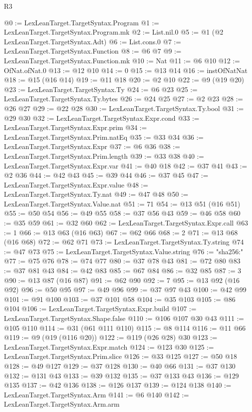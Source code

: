 \begin{lexlean}{R3}
\begin{coremodule}
@0 := LexLeanTarget.TargetSyntax.Program
@1 := LexLeanTarget.TargetSyntax.Program.mk
@2 := List.nil.{0}
@5 := @1 (@2 LexLeanTarget.TargetSyntax.Adt)
@6 := List.cons.{0}
@7 := LexLeanTarget.TargetSyntax.Function
@8 := @6 @7
@9 := LexLeanTarget.TargetSyntax.Function.mk
@10 := Nat
@11 := @6 @10
@12 := OfNat.ofNat.{0}
@13 := @12 @10
@14 := 0
@15 := @13 @14
@16 := instOfNatNat
@18 := @15 (@16 @14)
@19 := @11 @18
@20 := @2 @10
@22 := @9 (@19 @20)
@23 := LexLeanTarget.TargetSyntax.Ty
@24 := @6 @23
@25 := LexLeanTarget.TargetSyntax.Ty.bytes
@26 := @24 @25
@27 := @2 @23
@28 := @26 @27
@29 := @22 @28
@30 := LexLeanTarget.TargetSyntax.Ty.bool
@31 := @29 @30
@32 := LexLeanTarget.TargetSyntax.Expr.cond
@33 := LexLeanTarget.TargetSyntax.Expr.prim
@34 := LexLeanTarget.TargetSyntax.Prim.natEq
@35 := @33 @34
@36 := LexLeanTarget.TargetSyntax.Expr
@37 := @6 @36
@38 := LexLeanTarget.TargetSyntax.Prim.length
@39 := @33 @38
@40 := LexLeanTarget.TargetSyntax.Expr.var
@41 := @40 @18
@42 := @37 @41
@43 := @2 @36
@44 := @42 @43
@45 := @39 @44
@46 := @37 @45
@47 := LexLeanTarget.TargetSyntax.Expr.value
@48 := LexLeanTarget.TargetSyntax.Ty.nat
@49 := @47 @48
@50 := LexLeanTarget.TargetSyntax.Value.nat
@51 := 71
@54 := @13 @51 (@16 @51)
@55 := @50 @54
@56 := @49 @55
@58 := @37 @56 @43
@59 := @46 @58
@60 := @35 @59
@61 := @32 @60
@62 := LexLeanTarget.TargetSyntax.Expr.call
@63 := 1
@66 := @13 @63 (@16 @63)
@67 := @62 @66
@68 := 2
@71 := @13 @68 (@16 @68)
@72 := @62 @71
@73 := LexLeanTarget.TargetSyntax.Ty.string
@74 := @47 @73
@75 := LexLeanTarget.TargetSyntax.Value.string
@76 := "sha256:"
@77 := @75 @76
@78 := @74 @77
@80 := @37 @78 @43
@81 := @72 @80
@83 := @37 @81 @43
@84 := @42 @83
@85 := @67 @84
@86 := @32 @85
@87 := 3
@90 := @13 @87 (@16 @87)
@91 := @62 @90
@92 := 7
@95 := @13 @92 (@16 @92)
@96 := @50 @95
@97 := @49 @96
@99 := @37 @97 @43
@100 := @42 @99
@101 := @91 @100
@103 := @37 @101 @58
@104 := @35 @103
@105 := @86 @104
@106 := LexLeanTarget.TargetSyntax.Expr.build
@107 := LexLeanTarget.TargetSyntax.Shape.false
@110 := @106 @107 @30 @43
@111 := @105 @110
@114 := @31 (@61 @111 @110)
@115 := @8 @114
@116 := @11 @66
@119 := @9 (@19 (@116 @20))
@122 := @119 (@26 @28) @30
@123 := LexLeanTarget.TargetSyntax.Expr.match
@124 := @123 @30
@125 := LexLeanTarget.TargetSyntax.Prim.slice
@126 := @33 @125
@127 := @50 @18
@128 := @49 @127
@129 := @37 @128
@130 := @40 @66
@131 := @37 @130
@132 := @131 @43
@133 := @39 @132
@135 := @37 @133 @43
@136 := @129 @135
@137 := @42 @136
@138 := @126 @137
@139 := @124 @138
@140 := LexLeanTarget.TargetSyntax.Arm
@141 := @6 @140
@142 := LexLeanTarget.TargetSyntax.Arm.arm

\end{coremodule}
\end{lexlean}
